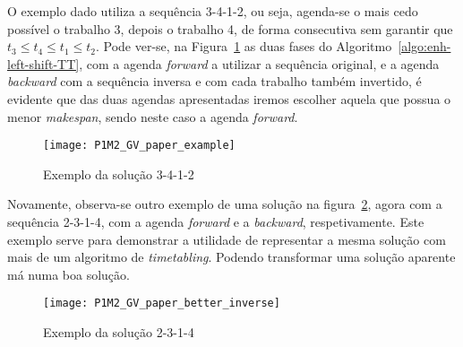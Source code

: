 O exemplo dado utiliza a sequência 3-4-1-2, ou seja, agenda-se o mais cedo possível o trabalho 3, depois o trabalho 4, de forma consecutiva sem garantir que $t_{3}\leq t_{4}\leq t_{1}\leq t_{2}$. Pode ver-se, na Figura~\ref{fig:P1M2_GV_paper_example} as duas fases do Algoritmo~\ref{algo:enh-left-shift-TT}, com a agenda \textit{forward} a utilizar a sequência original, e a agenda \textit{backward} com a sequência inversa e com cada trabalho também invertido, é evidente que das duas agendas apresentadas iremos escolher aquela que possua o menor \textit{makespan}, sendo neste caso a agenda \textit{forward}.\\
\begin{figure}[H]
	\centering
	\texttt{[image: P1M2\_GV\_paper\_example]}
	\caption{Exemplo da solução 3-4-1-2}
	\label{fig:P1M2_GV_paper_example}
\end{figure}

Novamente, observa-se outro exemplo de uma solução na figura~\ref{fig:P1M2_GV_paper_better_inverse}, agora com a sequência 2-3-1-4, com a agenda \textit{forward} e a \textit{backward}, respetivamente. Este exemplo serve para demonstrar a utilidade de representar a mesma solução com mais de um algoritmo de \textit{timetabling}. Podendo transformar uma solução aparente má numa boa solução.\\
\begin{figure}[H]
	\centering
	\texttt{[image: P1M2\_GV\_paper\_better\_inverse]}
	\caption{Exemplo da solução 2-3-1-4}
	\label{fig:P1M2_GV_paper_better_inverse}
\end{figure}

